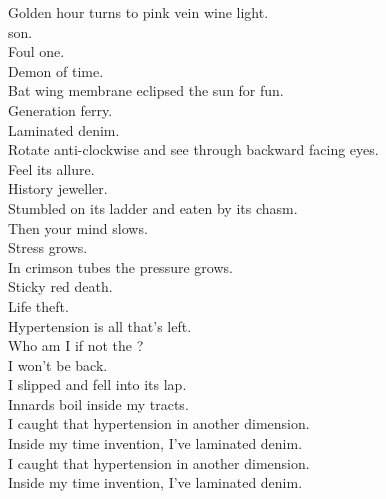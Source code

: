 Golden hour turns to pink vein wine light. \\
 son. \\
Foul one. \\
Demon of time. \\
Bat wing membrane eclipsed the sun for fun. \\

Generation ferry. \\
Laminated denim. \\
Rotate anti-clockwise and see through backward facing eyes. \\
Feel its allure. \\
History jeweller. \\
Stumbled on its ladder and eaten by its chasm. \\
Then your mind slows. \\
Stress grows. \\
In crimson tubes the pressure grows. \\
Sticky red death. \\
Life theft. \\
Hypertension is all that's left. \\

Who am I if not the ? \\
I won't be back. \\
I slipped and fell into its lap. \\
Innards boil inside my tracts. \\

I caught that hypertension in another dimension. \\
Inside my time invention, I've laminated denim. \\

I caught that hypertension in another dimension. \\
Inside my time invention, I've laminated denim. \\
